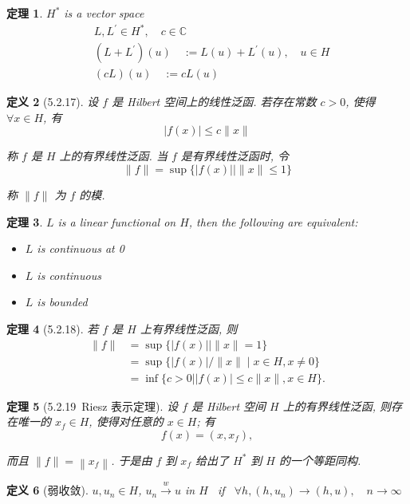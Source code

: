 \documentclass[10pt,openany]{book}
\theoremstyle{thmstyle} %
\newtheorem{theorem}{定理}[chapter]
\theoremstyle{defstyle} %
\newtheorem{definition}[theorem]{定义}
\theoremstyle{prostyle} %
\begin{document}
\begin{theorem}
$H^*$ is a vector space
$$
\begin{aligned}
& L, L^{\prime} \in H^*, \quad c \in \mathbb{C} \\
& \left(L+L^{\prime}\right)(u) \quad:=L(u)+L^{\prime}(u), \quad u \in H \\
& (c L)(u) \quad:=c L(u)
\end{aligned}
$$
\end{theorem}

\begin{definition}[5.2.17]
设 $f$ 是 Hilbert 空间上的线性泛函. 若存在常数 $c>0$, 使得 $\forall x \in H$, 有
$$
|f(x)| \leq c\|x\|
$$

称 $f$ 是 $H$ 上的有界线性泛函. 当 $f$ 是有界线性泛函时, 令
$$
\|f\|=\sup \{|f(x)| \mid\|x\| \leq 1\}
$$

称 $\|f\|$ 为 $f$ 的模.
\end{definition}

\begin{theorem}
$L$ is a linear functional on $H$, then the following are equivalent:
\begin{itemize}
  \item $L$ is continuous at 0
  \item $L$ is continuous
  \item $L$ is bounded
\end{itemize}

\end{theorem}

\begin{theorem}[5.2.18]
若 $f$ 是 $H$ 上有界线性泛函, 则
$$
\begin{aligned}
\|f\| & =\sup \{|f(x)| \mid\|x\|=1\} \\
& =\sup \{|f(x)| /\|x\| \mid x \in H, x \neq 0\} \\
& =\inf \{c>0|| f(x) \mid \leq c\|x\|, x \in H\} .
\end{aligned}
$$
\end{theorem}

\begin{theorem}[5.2.19~Riesz 表示定理]
设 $f$ 是 Hilbert 空间 $H$ 上的有界线性泛函, 则存在唯一的 $x_f \in H$, 使得对任意的 $x \in H$; 有
$$
f(x)=\left(x, x_f\right),
$$

而且 $\|f\|=\left\|x_f\right\|$. 于是由 $f$ 到 $x_f$ 给出了 $H^*$ 到 $H$ 的一个等距同构.
\end{theorem}

\begin{definition}[弱收敛] 
$ u, u_n \in H$, $u_n \xrightarrow{w} u$ in $H$ ~if ~$\forall h, \left(h, u_n\right) \longrightarrow(h, u) ,\quad n \rightarrow \infty$
\end{definition}
\end{document}
